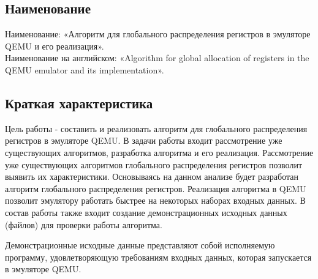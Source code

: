 \subsection{Наименование}
Наименование: «Алгоритм для глобального распределения регистров в эмуляторе QEMU и его реализация». \\
Наименование на английском: «Algorithm for global allocation of registers in the QEMU emulator and its implementation». \\


\subsection{Краткая характеристика}
    Цель работы - составить и реализовать алгоритм для глобального распределения регистров в эмуляторе QEMU.
    В задачи работы входит рассмотрение уже существующих алгоритмов, разработка алгоритма и его реализация.
    Рассмотрение уже существующих алгоритмов глобального распределения регистров позволит выявить их характеристики. Основываясь на данном анализе будет разработан алгоритм глобального распределения регистров. 
    Реализация алгоритма в QEMU позволит эмулятору работать быстрее на некоторых наборах входных данных.
    В состав работы также входит создание демонстрационных исходных данных (файлов) для проверки работы алгоритма.

\smallskip
Демонстрационные исходные данные представляют собой исполняемую программу, удовлетворяющую требованиям входных данных, которая запускается в эмуляторе QEMU.
